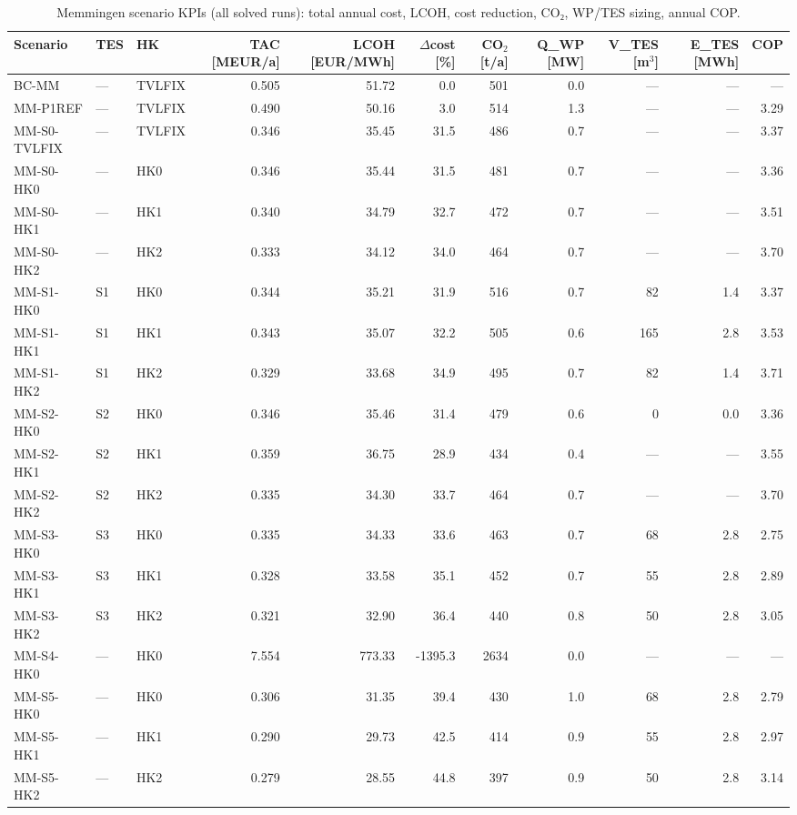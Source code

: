 \begin{table}[htbp]
  \centering
  \caption{Memmingen scenario KPIs (all solved runs): total annual cost, LCOH, cost reduction, CO₂, WP/TES sizing, annual COP.}
  \label{tab:tab_T4_memmingen_kpis}
  \begin{tabular}{ll lrrrrrrrr}
  \toprule
  Scenario & TES & HK & TAC [MEUR/a] & LCOH [EUR/MWh] & $\Delta$cost [\%] & CO$_2$ [t/a] & Q\_WP [MW] & V\_TES [m$^3$] & E\_TES [MWh] & COP \\
  \midrule
  BC-MM & — & TVLFIX & 0.505 & 51.72 & 0.0 & 501 & 0.0 & — & — & — \\
  MM-P1REF & — & TVLFIX & 0.490 & 50.16 & 3.0 & 514 & 1.3 & — & — & 3.29 \\
  MM-S0-TVLFIX & — & TVLFIX & 0.346 & 35.45 & 31.5 & 486 & 0.7 & — & — & 3.37 \\
  MM-S0-HK0 & — & HK0 & 0.346 & 35.44 & 31.5 & 481 & 0.7 & — & — & 3.36 \\
  MM-S0-HK1 & — & HK1 & 0.340 & 34.79 & 32.7 & 472 & 0.7 & — & — & 3.51 \\
  MM-S0-HK2 & — & HK2 & 0.333 & 34.12 & 34.0 & 464 & 0.7 & — & — & 3.70 \\
  MM-S1-HK0 & S1 & HK0 & 0.344 & 35.21 & 31.9 & 516 & 0.7 & 82 & 1.4 & 3.37 \\
  MM-S1-HK1 & S1 & HK1 & 0.343 & 35.07 & 32.2 & 505 & 0.6 & 165 & 2.8 & 3.53 \\
  MM-S1-HK2 & S1 & HK2 & 0.329 & 33.68 & 34.9 & 495 & 0.7 & 82 & 1.4 & 3.71 \\
  MM-S2-HK0 & S2 & HK0 & 0.346 & 35.46 & 31.4 & 479 & 0.6 & 0 & 0.0 & 3.36 \\
  MM-S2-HK1 & S2 & HK1 & 0.359 & 36.75 & 28.9 & 434 & 0.4 & — & — & 3.55 \\
  MM-S2-HK2 & S2 & HK2 & 0.335 & 34.30 & 33.7 & 464 & 0.7 & — & — & 3.70 \\
  MM-S3-HK0 & S3 & HK0 & 0.335 & 34.33 & 33.6 & 463 & 0.7 & 68 & 2.8 & 2.75 \\
  MM-S3-HK1 & S3 & HK1 & 0.328 & 33.58 & 35.1 & 452 & 0.7 & 55 & 2.8 & 2.89 \\
  MM-S3-HK2 & S3 & HK2 & 0.321 & 32.90 & 36.4 & 440 & 0.8 & 50 & 2.8 & 3.05 \\
  MM-S4-HK0 & — & HK0 & 7.554 & 773.33 & -1395.3 & 2634 & 0.0 & — & — & — \\
  MM-S5-HK0 & — & HK0 & 0.306 & 31.35 & 39.4 & 430 & 1.0 & 68 & 2.8 & 2.79 \\
  MM-S5-HK1 & — & HK1 & 0.290 & 29.73 & 42.5 & 414 & 0.9 & 55 & 2.8 & 2.97 \\
  MM-S5-HK2 & — & HK2 & 0.279 & 28.55 & 44.8 & 397 & 0.9 & 50 & 2.8 & 3.14 \\
  \bottomrule
  \end{tabular}
\end{table}

